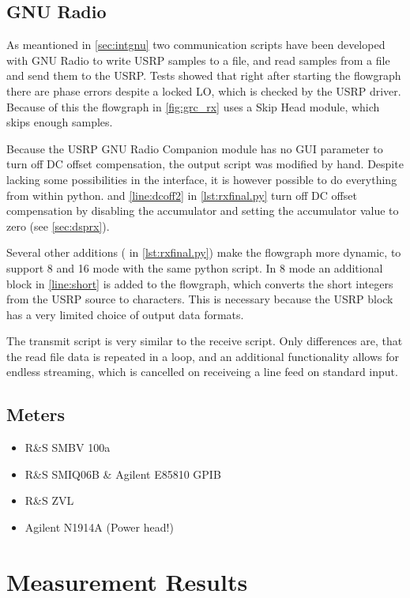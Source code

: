 \documentclass[12pt,a4paper,parskip=full]{scrartcl}
\begin{document}
\subsection{GNU Radio}
\label{sec:measgnu}
As meantioned in \cref{sec:intgnu} two communication scripts have been developed with GNU
Radio to write USRP samples to a file, and read samples from a file and send them to the USRP.
Tests showed that right after starting the flowgraph there are phase errors despite a
locked LO, which is checked by the USRP driver. Because of this the flowgraph in \cref{fig:grc_rx}
uses a {\ttfamily Skip Head} module, which skips enough samples.

Because the USRP GNU Radio Companion module has no GUI parameter to turn off DC offset
compensation, the output script was modified by hand. Despite lacking some possibilities
in the interface, it is however possible to do everything from within python.
 and \cref{line:dcoff2} in \cref{lst:rxfinal.py} turn off DC offset
compensation by disabling the accumulator and setting the accumulator value to zero 
(see \cref{sec:dsprx}).

Several other additions ( in \cref{lst:rxfinal.py})
make the flowgraph more dynamic, to support \SI{8}{\bit} and \SI{16}{\bit} mode with
the same python script. In \SI{8}{\bit} mode an additional block in \cref{line:short}
is added to the flowgraph, which converts the short integers from the USRP source to
characters. This is necessary because the USRP block has a very limited choice of
output data formats.

The transmit script is very similar to the receive script. Only differences are,
that the read file data is repeated in a loop, and an additional functionality
allows for endless streaming, which is cancelled on receiveing a line feed on
standard input.
\subsection{Meters}
\begin{itemize}
    \item R\&S SMBV 100a
    \item R\&S SMIQ06B \& Agilent E85810 GPIB
    \item R\&S ZVL
    \item Agilent N1914A (Power head!)
\end{itemize}
\section{Measurement Results}
\end{document}
